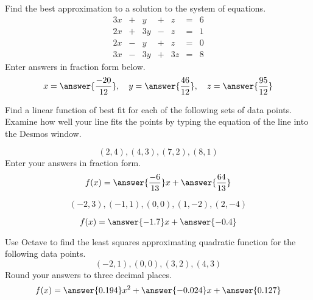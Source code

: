 \documentclass{ximera}
\begin{document}
\begin{problem}\label{prob:leastSq1}
Find the best approximation to a solution to the system of equations.
$$\begin{matrix}3x&+&y&+&z&=&6\\2x&+&3y&-&z&=&1\\2x&-&y&+&z&=&0\\3x&-&3y&+&3z&=&8\end{matrix}$$
Enter answers in fraction form below.
$$x=\answer{\frac{-20}{12}},\quad y=\answer{\frac{46}{12}},\quad z=\answer{\frac{95}{12}}$$
\end{problem}

\begin{problem}
Find a linear function of best fit for each of the following sets of data points.  Examine how well your line fits the points by typing the equation of the line into the Desmos window.

\begin{problem}\label{prob:leastSq2a}
$$(2,4), (4,3), (7,2), (8,1)$$
Enter your answers in fraction form.
$$f(x)=\answer{\frac{-6}{13}}x+\answer{\frac{64}{13}}$$
\begin{onlineOnly}
\begin{center}
\end{center}
\end{onlineOnly}
\end{problem}

\begin{problem}\label{prob:leastSq2b}
$$(-2, 3), (-1,1), (0,0), (1, -2), (2, -4)$$

$$f(x)=\answer{-1.7}x+\answer{-0.4}$$
\begin{onlineOnly}
\begin{center}
\end{center}
\end{onlineOnly}
\end{problem}
\end{problem}

\begin{problem}\label{prob:leastSq3}
Use Octave to find the least squares approximating quadratic function for the following data points.
$$(-2,1),(0,0),(3,2),(4,3)$$
Round your answers to three decimal places.
$$f(x)=\answer{0.194}x^2+\answer{-0.024}x+\answer{0.127}$$
\end{problem}


\end{document}
